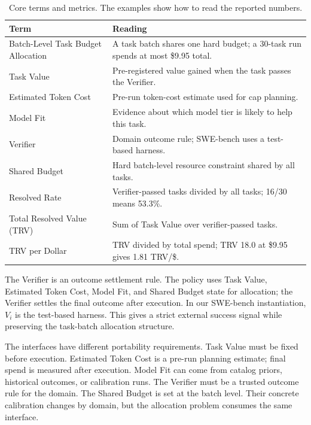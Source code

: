\documentclass{article}
\newcommand{\trv}{TRV\xspace}
\newcommand{\taskvalue}{Task Value\xspace}
\newcommand{\tokencost}{Estimated Token Cost\xspace}
\newcommand{\modelfit}{Model Fit\xspace}
\newcommand{\sharedbudget}{Shared Budget\xspace}
\newcommand{\verifier}{Verifier\xspace}
\begin{document}
\begin{table}[H]
\centering
\footnotesize
\begin{tabular}{@{}p{}p{}@{}}
\toprule
Term & Reading \\
\midrule
Batch-Level Task Budget Allocation & A task batch shares one hard budget; a 30-task run spends at most \$9.95 total. \\
\taskvalue & Pre-registered value gained when the task passes the \verifier. \\
\tokencost & Pre-run token-cost estimate used for cap planning. \\
\modelfit & Evidence about which model tier is likely to help this task. \\
\verifier & Domain outcome rule; SWE-bench uses a test-based harness. \\
\sharedbudget & Hard batch-level resource constraint shared by all tasks. \\
Resolved Rate & Verifier-passed tasks divided by all tasks; 16/30 means 53.3\%. \\
Total Resolved Value (\trv) & Sum of \taskvalue over verifier-passed tasks. \\
\trv per Dollar & \trv divided by total spend; \trv 18.0 at \$9.95 gives 1.81 \trv/\$. \\
\bottomrule
\end{tabular}
\caption{Core terms and metrics. The examples show how to read the reported numbers.}
\label{tab:glossary}
\end{table}

The \verifier is an outcome settlement rule. The policy uses \taskvalue, \tokencost, \modelfit, and \sharedbudget state for allocation; the \verifier settles the final outcome after execution. In our SWE-bench instantiation, $V_i$ is the test-based harness. This gives a strict external success signal while preserving the task-batch allocation structure.

The interfaces have different portability requirements. \taskvalue must be fixed before execution. \tokencost is a pre-run planning estimate; final spend is measured after execution. \modelfit can come from catalog priors, historical outcomes, or calibration runs. The \verifier must be a trusted outcome rule for the domain. The \sharedbudget is set at the batch level. Their concrete calibration changes by domain, but the allocation problem consumes the same interface.
\end{document}
